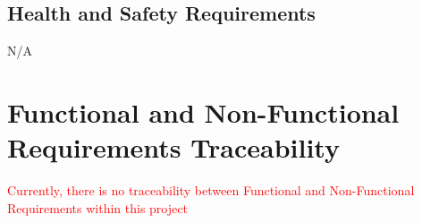 \documentclass[12pt, titlepage]{article}
\newcommand{\reqref}[1]{Req. \#: \ref{#1}}
\begin{document}
\subsection{Health and Safety Requirements}
N/A

\section{Functional and Non-Functional Requirements Traceability}
\textcolor{red}{Currently, there is no traceability between Functional and Non-Functional Requirements within this project}

\end{document}
